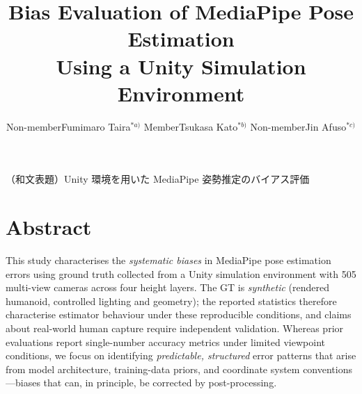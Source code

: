 \documentclass[twocolumn]{article}
\title{Bias Evaluation of MediaPipe Pose Estimation\\
       Using a Unity Simulation Environment}
\author{%
  Non-member\quad Fumimaro Taira$^{*a)}$ \qquad
  Member\quad    Tsukasa Kato$^{*b)}$ \qquad
  Non-member\quad Jin Afuso$^{*c)}$\footnotemark[1]
}
\date{}
\begin{document}
\maketitle
\begin{center}\small
（和文表題）Unity 環境を用いた MediaPipe 姿勢推定のバイアス評価
\end{center}

\begingroup
\renewcommand{\thefootnote}{}
\endgroup

\section*{Abstract}

This study characterises the \emph{systematic biases} in MediaPipe pose
estimation errors using ground truth collected from a Unity simulation
environment with 505 multi-view cameras across four height layers.
The GT is \emph{synthetic} (rendered humanoid, controlled lighting and
geometry); the reported statistics therefore characterise estimator
behaviour under these reproducible conditions, and claims about real-world
human capture require independent validation.
Whereas prior evaluations report single-number accuracy metrics under
limited viewpoint conditions, we focus on identifying \emph{predictable,
structured} error patterns that arise from model architecture, training-data
priors, and coordinate system conventions---biases that can, in principle,
be corrected by post-processing.
\end{document}
